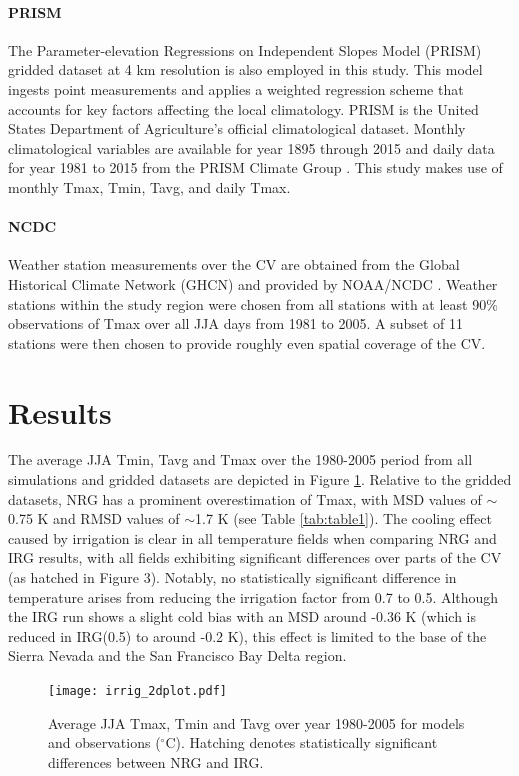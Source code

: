\paragraph{PRISM} The Parameter-elevation Regressions on Independent Slopes Model (PRISM) \cite{daly2008physiographically} gridded dataset at 4 km resolution is also employed in this study.  This model ingests point measurements and applies a weighted regression scheme that accounts for key factors affecting the local climatology. PRISM is the United States Department of Agriculture's official climatological dataset. Monthly climatological variables are available for year 1895 through 2015 and daily data for year 1981 to 2015 from the PRISM Climate Group \cite{prismSource}. This study makes use of monthly Tmax, Tmin, Tavg, and daily Tmax.

\paragraph{NCDC} Weather station measurements over the CV are obtained from the Global Historical Climate Network (GHCN) and provided by NOAA/NCDC \cite{menne2012overview}. Weather stations within the study region were chosen from all stations with at least 90$\%$ observations of Tmax over all JJA days from 1981 to 2005.  A subset of 11 stations were then chosen to provide roughly even spatial coverage of the CV.

\section{Results}

The average JJA Tmin, Tavg and Tmax over the 1980-2005 period from all simulations and gridded datasets are depicted in Figure \ref{fig:Figure 3}. Relative to the gridded datasets, NRG has a prominent overestimation of Tmax, with MSD values of $\sim$0.75 K and RMSD values of $\sim$1.7 K (see Table \ref{tab:table1}). The cooling effect caused by irrigation is clear in all temperature fields when comparing NRG and IRG results, with all fields exhibiting significant differences over parts of the CV (as hatched in Figure 3). Notably, no statistically significant difference in temperature arises from reducing the irrigation factor from 0.7 to 0.5. Although the IRG run shows a slight cold bias with an MSD around -0.36 K (which is reduced in IRG(0.5) to around -0.2 K), this effect is limited to the base of the Sierra Nevada and the San Francisco Bay Delta region.

\begin{figure}
\begin{center}
\texttt{[image: irrig\_2dplot.pdf]}
\caption{Average JJA Tmax, Tmin and Tavg over year 1980-2005 for models and observations ($^\circ$C). Hatching denotes statistically significant differences between NRG and IRG.}
\label{fig:Figure 3}
\end{center}
\end{figure}

